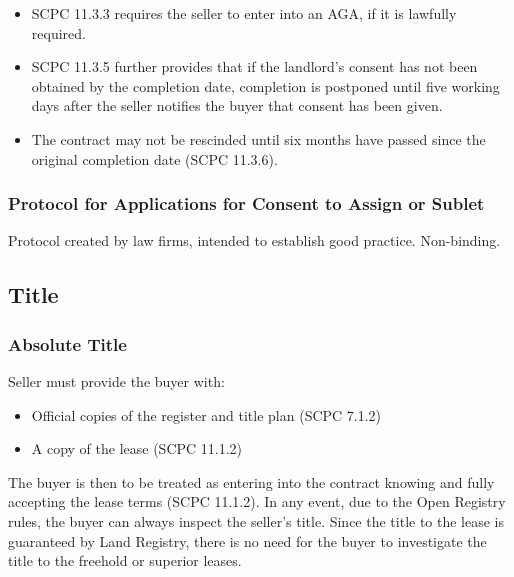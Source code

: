 \documentclass[
]{article}
\providecommand{\tightlist}{%
  \setlength{\itemsep}{0pt}\setlength{\parskip}{0pt}}
\begin{document}
\begin{itemize}
\tightlist
\item
  SCPC 11.3.3 requires the seller to enter into an AGA, if it is
  lawfully required.
\item
  SCPC 11.3.5 further provides that if the landlord's consent has not
  been obtained by the completion date, completion is postponed until
  five working days after the seller notifies the buyer that consent has
  been given.
\item
  The contract may not be rescinded until six months have passed since
  the original completion date (SCPC 11.3.6).
\end{itemize}

\hypertarget{protocol-for-applications-for-consent-to-assign-or-sublet}{%
\subsubsection{Protocol for Applications for Consent to Assign or
Sublet}\label{protocol-for-applications-for-consent-to-assign-or-sublet}}

Protocol created by law firms, intended to establish good practice.
Non-binding.

\hypertarget{title}{%
\subsection{Title}\label{title}}

\hypertarget{absolute-title}{%
\subsubsection{Absolute Title}\label{absolute-title}}

Seller must provide the buyer with:

\begin{itemize}
\tightlist
\item
  Official copies of the register and title plan (SCPC 7.1.2)
\item
  A copy of the lease (SCPC 11.1.2)
\end{itemize}

The buyer is then to be treated as entering into the contract knowing
and fully accepting the lease terms (SCPC 11.1.2). In any event, due to
the Open Registry rules, the buyer can always inspect the seller's
title. Since the title to the lease is guaranteed by Land Registry,
there is no need for the buyer to investigate the title to the freehold
or superior leases.
\end{document}
